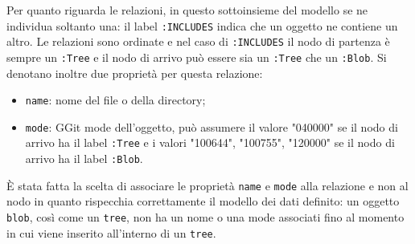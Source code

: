 Per quanto riguarda le relazioni, in questo sottoinsieme del modello se ne individua soltanto una: il label \texttt{:INCLUDES} indica che un oggetto ne contiene un altro. Le relazioni sono ordinate e nel caso di \texttt{:INCLUDES} il nodo di partenza è sempre un \texttt{:Tree} e il nodo di arrivo può essere sia un \texttt{:Tree} che un \texttt{:Blob}.
Si denotano inoltre due proprietà per questa relazione:
\begin{itemize}
    \item \texttt{name}: nome del file o della directory;
    \item \texttt{mode}: GGit mode dell'oggetto, può assumere il valore "040000" se il nodo di arrivo ha il label \texttt{:Tree} e i valori {"100644", "100755", "120000"} se il nodo di arrivo ha il label \texttt{:Blob}.
\end{itemize}

È stata fatta la scelta di associare le proprietà \texttt{name} e \texttt{mode} alla relazione e non al nodo in quanto rispecchia correttamente il modello dei dati definito: un oggetto \texttt{blob}, così come un \texttt{tree}, non ha un nome o una mode associati fino al momento in cui viene inserito all'interno di un \texttt{tree}.

